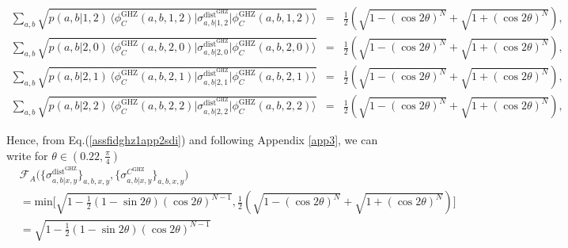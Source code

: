 \documentclass[reprint,superscriptaddress,nofootinbib,amsmath,amssymb,aps,pra,longbibliography]{revtex4-1}
\begin{document}
\begin{widetext}
\begin{eqnarray}
	\sum_{a,b} \sqrt{p(a,b|1,2) \, \Big\langle \phi_{C}^{\text{GHZ}} (a,b, 1,2) \Big| \sigma_{a,b|1,2}^{\text{dist}^{\text{GHZ}}} \Big| \phi_{C}^{\text{GHZ}} (a,b, 1,2) \Big\rangle} &=& \frac{1}{2} \left(\sqrt{1- (\cos 2 \theta )^N}+\sqrt{ 1+ (\cos 2 \theta )^N }\right), \label{AF2SG41} \\
	\sum_{a,b} \sqrt{p(a,b|2,0) \, \Big\langle \phi_{C}^{\text{GHZ}} (a,b, 2,0) \Big| \sigma_{a,b|2,0}^{\text{dist}^{\text{GHZ}}} \Big| \phi_{C}^{\text{GHZ}} (a,b, 2,0) \Big\rangle} &=& \frac{1}{2} \left(\sqrt{1- (\cos 2 \theta )^N}+\sqrt{ 1+ (\cos 2 \theta )^N }\right), \label{AF2SG42} \\
	\sum_{a,b} \sqrt{p(a,b|2,1) \, \Big\langle \phi_{C}^{\text{GHZ}} (a,b, 2,1) \Big| \sigma_{a,b|2,1}^{\text{dist}^{\text{GHZ}}} \Big| \phi_{C}^{\text{GHZ}} (a,b, 2,1) \Big\rangle} &=& \frac{1}{2} \left(\sqrt{1- (\cos 2 \theta )^N}+\sqrt{ 1+ (\cos 2 \theta )^N }\right), \label{AF2SG43} \\
	\sum_{a,b} \sqrt{p(a,b|2,2) \, \Big\langle \phi_{C}^{\text{GHZ}} (a,b, 2,2) \Big| \sigma_{a,b|2,2}^{\text{dist}^{\text{GHZ}}} \Big| \phi_{C}^{\text{GHZ}} (a,b, 2,2) \Big\rangle} &=& \frac{1}{2} \left(\sqrt{1- (\cos 2 \theta )^N}+\sqrt{ 1+ (\cos 2 \theta )^N }\right), \label{AF2SG44}
\end{eqnarray}

Hence, from Eq.(\ref{assfidghz1app2sdi}) and following Appendix \ref{app3}, we can write for $\theta \in ( 0.22, \frac{\pi}{4})$
\begin{align}
    &\mathcal{F}_A \Big(\{\sigma_{a,b|x,y}^{\text{dist}^{\text{GHZ}}}\}_{a,b,x,y}, \{\sigma_{a,b|x,y}^{C^{\text{GHZ}}}\}_{a,b,x,y} \Big) \nonumber \\
    &= \mathrm{min} \Bigg[\sqrt{1 - \frac{1}{2} (1 - \sin 2 \theta ) (\cos 2 \theta )^{N-1}},  \frac{1}{2} \left(\sqrt{1- (\cos 2 \theta )^N}+\sqrt{ 1+ (\cos 2 \theta )^N }\right) \Bigg] \nonumber \\
    &= \sqrt{1 - \frac{1}{2} (1 - \sin 2 \theta ) (\cos 2 \theta )^{N-1}}
    \label{app6eq3new}
\end{align}



\end{widetext}
\end{document}
